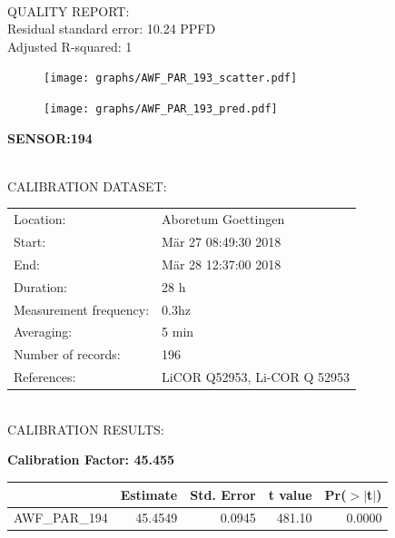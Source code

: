 \documentclass[oneside]{report}
\begin{document}
\hrulefill\\
QUALITY REPORT:\\
Residual standard error: 10.24 PPFD\\
Adjusted R-squared: 1



\begin{figure}[H]
  \centering
  \texttt{[image: graphs/AWF\_PAR\_193\_scatter.pdf]}
\end{figure}




\begin{figure}[H]
  \centering
  \texttt{[image: graphs/AWF\_PAR\_193\_pred.pdf]}
\end{figure}

\pagebreak


\begin{center}
\large{\textbf{SENSOR:194}}\\
\end{center}

\hrulefill\\
CALIBRATION DATASET:\\
\begin{table}[h!]
  \centering
  \label{tab:table1}
  \begin{tabular}{ll}
    Location: & Aboretum Goettingen\\ 
    
    
    Start:  & Mär 27 08:49:30 2018 \\
    End:   & Mär 28 12:37:00 2018\\ 
    Duration: & 28 h\\
    Measurement frequency: & 0.3hz\\
    Averaging:  &5 min\\
    Number of records: & 196 \\
    References: & LiCOR Q52953, Li-COR Q 52953 \\
  \end{tabular}
\end{table}

\hrulefill\\
CALIBRATION RESULTS:\\


\begin{center}
\textbf{\large{Calibration Factor: 45.455}}\\
\end{center}
\begin{table}[ht]
\centering
\begin{tabular}{rrrrr}
  \hline
 & Estimate & Std. Error & t value & Pr($>$$|$t$|$) \\ 
  \hline
AWF\_PAR\_194 & 45.4549 & 0.0945 & 481.10 & 0.0000 \\ 
   \hline
\end{tabular}
\end{table}
\end{document}
